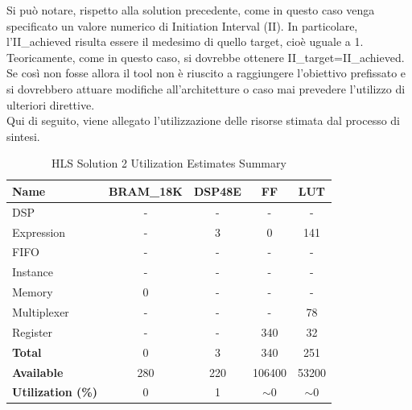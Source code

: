 Si può notare, rispetto alla solution precedente, come in questo caso venga specificato un valore numerico di Initiation Interval (II). In particolare, l'II\_achieved risulta essere il medesimo di quello target, cioè uguale a 1. Teoricamente, come in questo caso, si dovrebbe ottenere II\_target=II\_achieved. Se così non fosse allora il tool non è riuscito a raggiungere l'obiettivo prefissato e si dovrebbero attuare modifiche all'architetture o caso mai prevedere l'utilizzo di ulteriori direttive.
\\
Qui di seguito, viene allegato l'utilizzazione delle risorse stimata dal processo di sintesi.
\begin{table}[h]
	\centering
	\begin{tabular}{|l|c|c|c|c|}
		\hline
		\textbf{Name}    & \textbf{BRAM\_18K} & \textbf{DSP48E} & \textbf{FF} & \textbf{LUT} \\ \hline
		DSP              & -                   & -               & -           & -            \\ 
		Expression       & -                   & 3               & 0           & 141          \\ 
		FIFO             & -                   & -               & -           & -            \\ 
		Instance         & -                   & -               & -           & -            \\ 
		Memory           & 0                   & -               & -          & -            \\ 
		Multiplexer      & -                   & -               & -           & 78          \\ 
		Register         & -                   & -               & 340         & 32            \\ \hline
		\textbf{Total}   & 0                   & 3               & 340         & 251          \\ \hline
		\textbf{Available} & 280               & 220             & 106400      & 53200        \\ \hline
		\textbf{Utilization (\%)} & 0            & 1               & $\sim$0     & $\sim$0      \\ \hline
	\end{tabular}
	\caption{HLS Solution 2 Utilization Estimates Summary}
	\label{tab:hls-solution-2-utilization-estimates-summary}
\end{table}

